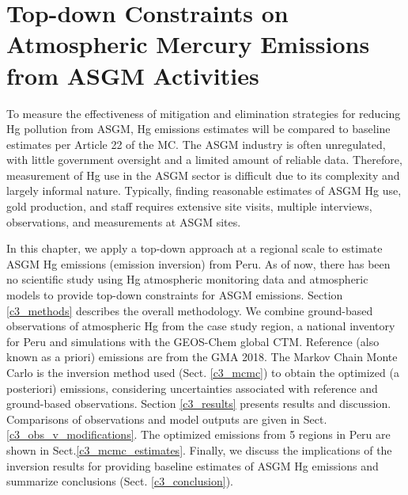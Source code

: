 \chapter{Top-down Constraints on Atmospheric Mercury Emissions from ASGM Activities}\label{Chapter3}
To measure the effectiveness of mitigation and elimination strategies for reducing Hg pollution from ASGM, Hg emissions estimates will be compared to baseline estimates per Article 22 of the MC. The ASGM industry is often unregulated, with little government oversight and a limited amount of reliable data\cite{oneill_estimating_2017}.  Therefore, measurement of Hg use in the ASGM sector is difficult due to its complexity and largely informal nature.  Typically, finding reasonable estimates of ASGM Hg use, gold production, and staff requires extensive site visits, multiple interviews, observations, and measurements at ASGM sites\cite{oneill_estimating_2017}.
\begin{flushleft}
In this chapter, we apply a top-down approach at a regional scale to estimate ASGM Hg emissions (emission inversion) from Peru. As of now, there has been no scientific study using Hg atmospheric monitoring data and atmospheric models to provide top-down constraints for ASGM emissions. Section \ref{c3_methods} describes the overall methodology. We combine ground-based observations of atmospheric Hg from the case study region\cite{koenig_seasonal_2021}, a national inventory for Peru\cite{artisanal_gold_council_reporte_2017} and simulations with the GEOS-Chem global CTM. Reference (also known as a priori) emissions are from the GMA 2018\cite{united_nations_environment_programme_technical_2019,steenhuisen_development_2019}. The Markov Chain Monte Carlo is the inversion method used (Sect. \ref{c3_mcmc}) to obtain the optimized (a posteriori) emissions, considering uncertainties associated with reference and ground-based observations. Section \ref{c3_results} presents results and discussion. Comparisons of observations and model outputs are given in Sect. \ref{c3_obs_v_modifications}. The optimized emissions from 5 regions in Peru are shown in Sect.\ref{c3_mcmc_estimates}. Finally, we discuss the implications of the inversion results for providing baseline estimates of ASGM Hg emissions and summarize conclusions (Sect. \ref{c3_conclusion}).

\end{flushleft}
